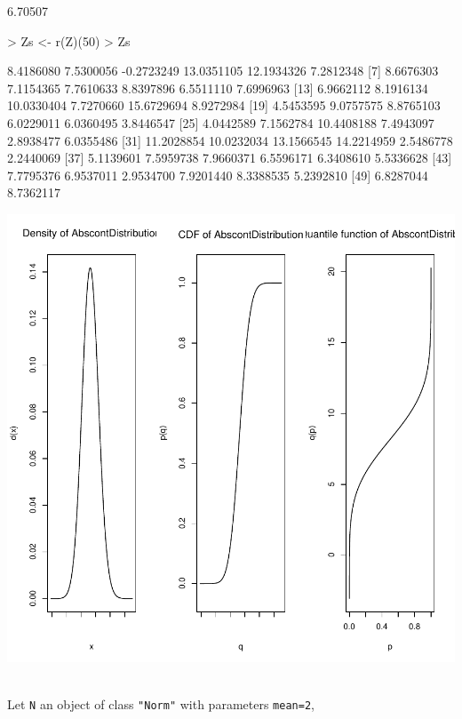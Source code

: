 \documentclass[11pt]{article}
\newcommand{\code}[1]{{\tt #1}}
\begin{document}
\begin{Schunk}
\begin{Soutput}
[1] 6.70507
\end{Soutput}
\begin{Sinput}
> Zs <- r(Z)(50)
> Zs
\end{Sinput}
\begin{Soutput}
 [1]  8.4186080  7.5300056 -0.2723249 13.0351105 12.1934326  7.2812348
 [7]  8.6676303  7.1154365  7.7610633  8.8397896  6.5511110  7.6996963
[13]  6.9662112  8.1916134 10.0330404  7.7270660 15.6729694  8.9272984
[19]  4.5453595  9.0757575  8.8765103  6.0229011  6.0360495  3.8446547
[25]  4.0442589  7.1562784 10.4408188  7.4943097  2.8938477  6.0355486
[31] 11.2028854 10.0232034 13.1566545 14.2214959  2.5486778  2.2440069
[37]  5.1139601  7.5959738  7.9660371  6.5596171  6.3408610  5.5336628
[43]  7.7795376  6.9537011  2.9534700  7.9201440  8.3388535  5.2392810
[49]  6.8287044  8.7362117
\end{Soutput}
\end{Schunk}
\includegraphics{distr-exam1}
\par
\begin{small}
\\
Let \code{N} an object of class \code{"Norm"} with parameters  \code{mean=2},

\end{small}
\end{document}
\end{Sinput}
\end{Schunk}
\end{document}
